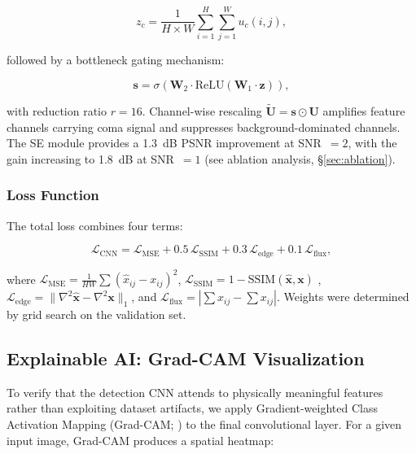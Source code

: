 \documentclass[usenatbib]{mnras}
\begin{document}
\begin{equation}\label{eq:se_squeeze}
z_c = \frac{1}{H \times W} \sum_{i=1}^{H} \sum_{j=1}^{W} u_c(i, j),
\end{equation}

followed by a bottleneck gating mechanism:

\begin{equation}\label{eq:se_excitation}
\mathbf{s} = \sigma\left(\mathbf{W}_2 \cdot \text{ReLU}\left(\mathbf{W}_1 \cdot \mathbf{z}\right)\right),
\end{equation}

with reduction ratio $r=16$. Channel-wise rescaling $\tilde{\mathbf{U}} = \mathbf{s} \odot \mathbf{U}$ amplifies feature channels carrying coma signal and suppresses background-dominated channels. The SE module provides a 1.3~dB PSNR improvement at SNR~$=2$, with the gain increasing to 1.8~dB at SNR~$=1$ (see ablation analysis, \S\ref{sec:ablation}).

\subsubsection{Loss Function}

The total loss combines four terms:

\begin{equation}\label{eq:total_loss}
\mathcal{L}_{\text{CNN}} = \mathcal{L}_{\text{MSE}} + 0.5\,\mathcal{L}_{\text{SSIM}} + 0.3\,\mathcal{L}_{\text{edge}} + 0.1\,\mathcal{L}_{\text{flux}},
\end{equation}

where $\mathcal{L}_{\text{MSE}} = \frac{1}{HW}\sum(\hat{x}_{ij} - x_{ij})^2$, $\mathcal{L}_{\text{SSIM}} = 1 - \text{SSIM}(\hat{\mathbf{x}}, \mathbf{x})$ \citep{wang04}, $\mathcal{L}_{\text{edge}} = \|\nabla^2\hat{\mathbf{x}} - \nabla^2\mathbf{x}\|_1$, and $\mathcal{L}_{\text{flux}} = |\sum\hat{x}_{ij} - \sum x_{ij}|$. Weights were determined by grid search on the validation set.

\subsection{Explainable AI: Grad-CAM Visualization}\label{sec:xai}

To verify that the detection CNN attends to physically meaningful features rather than exploiting dataset artifacts, we apply Gradient-weighted Class Activation Mapping (Grad-CAM; \citealt{selvaraju17}) to the final convolutional layer. For a given input image, Grad-CAM produces a spatial heatmap:
\end{document}
